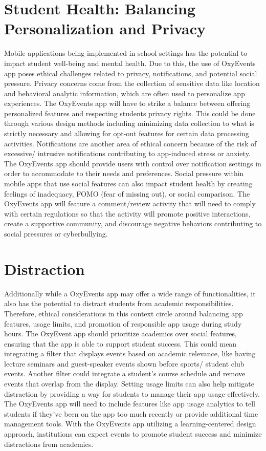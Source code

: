 \documentclass[10pt,twocolumn]{article}
\begin{document}
\section{Student Health: Balancing Personalization and Privacy}
Mobile applications being implemented in school settings has the potential to impact student well-being and mental health\cite{UofW_IT}. Due to this, the use of OxyEvents app poses ethical challenges related to privacy, notifications, and potential social pressure.
Privacy concerns come from the collection of sensitive data like location and behavioral analytic information, which are often used to personalize app experiences. The OxyEvents app will have to strike a balance between offering personalized features and respecting students privacy rights. This could be done through various design methods including minimizing data collection to what is strictly necessary and allowing for opt-out features for certain data processing activities.\cite{ANA_MobileMarketing}
Notifications are another area of ethical concern because of the risk of excessive/ intrusive notifications contributing to app-induced stress or anxiety.\cite{Appedus} The OxyEvents app should provide users with control over notification settings in order to accommodate to their needs and preferences.
Social pressure within mobile apps that use social features can also impact student health by creating feelings of inadequacy, FOMO (fear of missing out), or social comparison. The OxyEvents app will feature a comment/review activity that will need to comply with certain regulations so that the activity will promote positive interactions, create a supportive community, and discourage negative behaviors contributing to social pressures or cyberbullying.

\section{Distraction}
Additionally while a OxyEvents app may offer a wide range of functionalities, it also has the potential to distract students from academic responsibilities. Therefore, ethical considerations in this context circle around balancing app features, usage limits, and promotion of responsible app usage during study hours.
The OxyEvent app should prioritize academics over social features, ensuring that the app is able to support student success. This could mean integrating a filter that displays events based on academic relevance, like having lecture seminars and guest-speaker events shown before sports/ student club events. Another filter could integrate a student's course schedule and remove events that overlap from the display. 
Setting usage limits can also help mitigate distraction by providing a way for students to manage their app usage effectively. The OxyEvents app will need to include features like app usage analytics to tell students if they've been on the app too much recently or provide additional time management tools.
With the OxyEvents app utilizing a learning-centered design approach, institutions can expect events to promote student success and minimize distractions from academics.\cite{Appedus}
\end{document}
